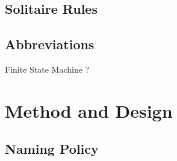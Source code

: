 \documentclass[runningheads,a4paper]{llncs}
\begin{document}
\subsection{Solitaire Rules}

\subsection{Abbreviations}

Finite State Machine ?


\section{Method and Design}
\label{sec:2_method_and_design}
\subsection{Naming Policy}
\end{document}
